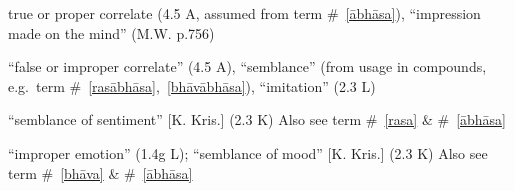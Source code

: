 \documentclass[10pt]{article}
\begin{document}
\begin{multicols}{2}
\begin{enumerate}[
			leftmargin=0em,
			rightmargin=0em,
		]
		 true or proper correlate (4.5 A, assumed from term \#~\ref{ābhāsa}),
		``impression made on the mind'' (M.W. p.756)

		 ``false or improper correlate'' (4.5 A),
		``semblance'' (from usage in compounds, e.g.\ term \#~\ref{rasābhāsa},~\ref{bhāvābhāsa}),
		``imitation'' (2.3 L)

		 ``semblance of sentiment'' [K. Kris.] (2.3 K)
		Also see term \#~\ref{rasa} \& \#~\ref{ābhāsa}

		 ``improper emotion'' (1.4g L);
		``semblance of mood'' [K. Kris.] (2.3 K)
		Also see term \#~\ref{bhāva} \& \#~\ref{ābhāsa}


\end{enumerate}
\end{multicols}
\end{document}
